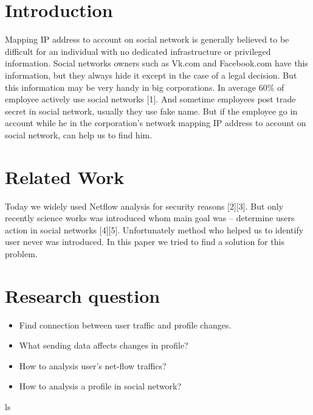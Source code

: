 \documentclass[12pt,a4paper]{report}
\begin{document}
\section{Introduction}
Mapping IP address to account on social network is generally believed to be difficult for an individual with no dedicated infrastructure or privileged information. Social networks owners such as Vk.com and Facebook.com have this information, but they always hide it except in the case of a legal decision. But this information may be very handy in big corporations. In average 60\% of employee actively use social networks [1]. And sometime employees post trade secret in social network, usually they use fake name. But if the employee go in  account while he in the corporation's network mapping IP address to account on social network, can help us to find him.

\section{Related Work}
Today we widely used Netflow analysis for security reasons [2][3]. But only recently science works was introduced whom main goal was – determine users action in social networks [4][5]. Unfortunately method who helped us to identify user never was introduced. In this paper we tried to find a solution for this problem.

\section{Research question}
\begin{itemize}
	\item{Find connection between user traffic and profile changes.}
	\item{What sending data affects changes in profile?}
	\item{How to analysis user's net-flow traffics?}
	\item{How to analysis a profile in social network?}
\end{itemize}ls
\end{document}
